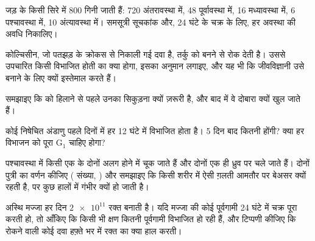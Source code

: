\begin{exercise}[$\star\star$]\label{exo:g11:cell-cycle-mitosis:8}
जड़ के किसी सिरे में 800  गिनी जाती हैं: 720 अंतरावस्था में, 48
पूर्वावस्था में, 16 मध्यावस्था में, 6 पश्चावस्था में, 10 अंत्यावस्था में।
समसूत्री सूचकांक और, 24 घंटे के चक्र के लिए, हर अवस्था की अवधि निकालिए।
\end{exercise}

\begin{exercise}[$\star\star$]\label{exo:g11:cell-cycle-mitosis:9}
कोल्चिसीन, जो पतझड़ के क्रोकस से निकाली गई दवा है, तर्कु को बनने से रोक
देती है। उससे उपचारित किसी विभाजित होती  का क्या होगा, इसका अनुमान
लगाइए, और यह भी कि जीवविज्ञानी उसे  बनाने के लिए क्यों
इस्तेमाल करते हैं।
\end{exercise}

\begin{exercise}[$\star\star$]\label{exo:g11:cell-cycle-mitosis:10}
समझाइए कि  को हिलाने से पहले उनका सिकुड़ना क्यों ज़रूरी है, और
बाद में वे दोबारा क्यों खुल जाते हैं।
\end{exercise}

\begin{exercise}[$\star\star$]\label{exo:g11:cell-cycle-mitosis:11}
कोई निषेचित अंडाणु पहले दिनों में हर 12 घंटे में विभाजित होता है। 5 दिन
बाद कितनी  होंगी? क्या हर विभाजन को पूरा $\mathrm{G_1}$ चाहिए
होगा?
\end{exercise}

\begin{exercise}[$\star\star\star$]\label{exo:g11:cell-cycle-mitosis:12}
पश्चावस्था में किसी एक  के दोनों  अलग होने में चूक जाते
हैं और दोनों एक ही ध्रुव पर चले जाते हैं। दोनों पुत्री  का वर्णन
कीजिए ( संख्या, ) और समझाइए कि किसी शरीर  में ऐसी ग़लती
आमतौर पर बेअसर क्यों रहती है, पर कुछ हालों में गंभीर क्यों हो जाती है।
\end{exercise}

\begin{exercise}[$\star\star\star$]\label{exo:g11:cell-cycle-mitosis:13}
अस्थि मज्जा हर दिन $\num{2e11}$ रक्त  बनाती है। यदि मज्जा की कोई
पूर्वगामी  24 घंटे में चक्र पूरा करती हो, तो आँकिए कि किसी भी क्षण
कितनी पूर्वगामी  विभाजित हो रही हैं, और टिप्पणी कीजिए कि  रोकने वाली कोई दवा हफ़्ते भर में रक्त का क्या हाल करती।
\end{exercise}

